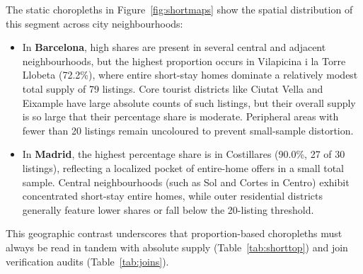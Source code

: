 \documentclass[11pt,a4paper]{article}
\begin{document}
The static choropleths in Figure~\ref{fig:shortmaps} show the spatial distribution of this segment across city neighbourhoods:
\begin{itemize}
\item In \textbf{Barcelona}, high shares are present in several central and adjacent neighbourhoods, but the highest proportion occurs in Vilapicina i la Torre Llobeta (72.2\%), where entire short-stay homes dominate a relatively modest total supply of 79 listings. Core tourist districts like Ciutat Vella and Eixample have large absolute counts of such listings, but their overall supply is so large that their percentage share is moderate. Peripheral areas with fewer than 20 listings remain uncoloured to prevent small-sample distortion.
\item In \textbf{Madrid}, the highest percentage share is in Costillares (90.0\%, 27 of 30 listings), reflecting a localized pocket of entire-home offers in a small total sample. Central neighbourhoods (such as Sol and Cortes in Centro) exhibit concentrated short-stay entire homes, while outer residential districts generally feature lower shares or fall below the 20-listing threshold.
\end{itemize}
This geographic contrast underscores that proportion-based choropleths must always be read in tandem with absolute supply (Table~\ref{tab:shorttop}) and join verification audits (Table~\ref{tab:joins}).

\clearpage
\end{document}
